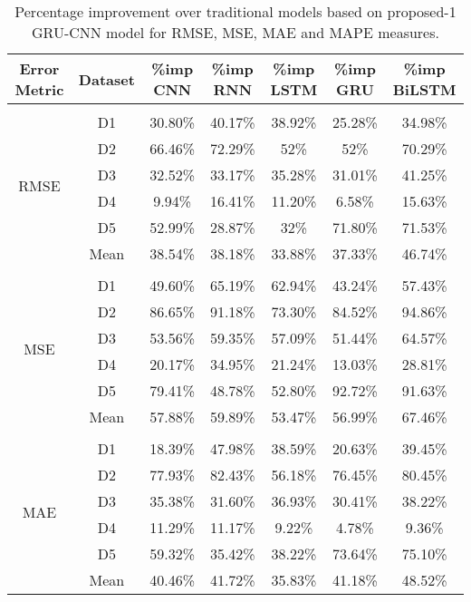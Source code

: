 \begin{table}[!h]
\setlength{\tabcolsep}{3pt}
 {\renewcommand{\arraystretch}{1}%
    \caption{Percentage improvement over traditional models based on proposed-1 GRU-CNN model for RMSE,  MSE,  MAE and MAPE measures.}
    \label{tab:error_metrics}
    \begin{tabular}{ccccccc}
        \toprule
        Error Metric & Dataset & \%imp CNN & \%imp RNN & \%imp LSTM & 
        \%imp GRU & \%imp BiLSTM \\
        \midrule
        \multirow{7}{*}{RMSE} \\
        & D1 & 30.80\% & 40.17\% & 38.92\% & 25.28\% & 34.98\% \\
        & D2 & 66.46\% & 72.29\% & 52\% & 52\% & 70.29\% \\
        & D3 & 32.52\% & 33.17\% & 35.28\% & 31.01\% & 41.25\% \\
        & D4 & 9.94\% & 16.41\% & 11.20\% & 6.58\% & 15.63\%\\
        & D5 & 52.99\% & 28.87\% & 32\% & 71.80\% & 71.53\%\\
        & Mean & 38.54\% & 38.18\% & 33.88\% & 37.33\% & 46.74\%\\
        \midrule
        \multirow{7}{*}{MSE}\\
        & D1 & 49.60\% & 65.19\% & 62.94\% & 43.24\% & 57.43\%\\
        & D2 & 86.65\% & 91.18\% & 73.30\% & 84.52\% & 94.86\%\\
        & D3 & 53.56\%  & 59.35\% & 57.09\% & 51.44\% & 64.57\%\\
        & D4 & 20.17\% & 34.95\% & 21.24\% & 13.03\% & 28.81\%\\
        & D5 & 79.41\% & 48.78\% & 52.80\% & 92.72\% & 91.63\%\\
        & Mean & 57.88\% & 59.89\% & 53.47\% & 56.99\% & 67.46\%\\
        \midrule
        \multirow{7}{*}{MAE}\\
        & D1 & 18.39\% & 47.98\% & 38.59\% & 20.63\% & 39.45\%\\
        & D2 & 77.93\% & 82.43\% & 56.18\% & 76.45\% & 80.45\%\\
        & D3 & 35.38\% & 31.60\% & 36.93\% & 30.41\% & 38.22\%\\
        & D4 & 11.29\% & 11.17\% & 9.22\% & 4.78\% & 9.36\%\\
        & D5  & 59.32\% & 35.42\% & 38.22\% & 73.64\% & 75.10\%\\
        & Mean & 40.46\% & 41.72\% & 35.83\% & 41.18\% & 48.52\%\\

\end{tabular}}
\end{table}
